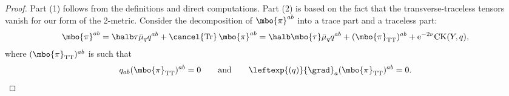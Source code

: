 \begin{proof}
Part (1) follows from the definitions and direct computations. Part (2) is based on the fact that the transverse-traceless tensors vanish for our form of the 2-metric. Consider the decomposition of $\mbo{\pi}^{ab}$ into a trace part and a traceless part:
\begin{align} \label{split-pi}
\mbo{\pi}^{ab} = \halb \tau \bar{\mu}_q q^{ab} + \cancel{\operatorname{Tr}} \, \mbo{\pi}^{ab}
= \halb \mbo{\tau} \bar{\mu}_q q^{ab} + (\mbo{\pi}_{{\rm TT}})^{ab} + {\rm e}^{-2\nu} {\rm CK} (Y, q),
\end{align}
where $(\mbo{\pi}_{{\rm TT}})^{ab}$ is such that
\begin{align} \label{tt-cond}
q_{ab} (\mbo{\pi}_{{\rm TT}})^{ab} =0 \qquad \text{and} \qquad \leftexp{(q)}{\grad}_a (\mbo{\pi}_{{\rm TT}})^{ab} =0.
\end{align}


\end{proof}
